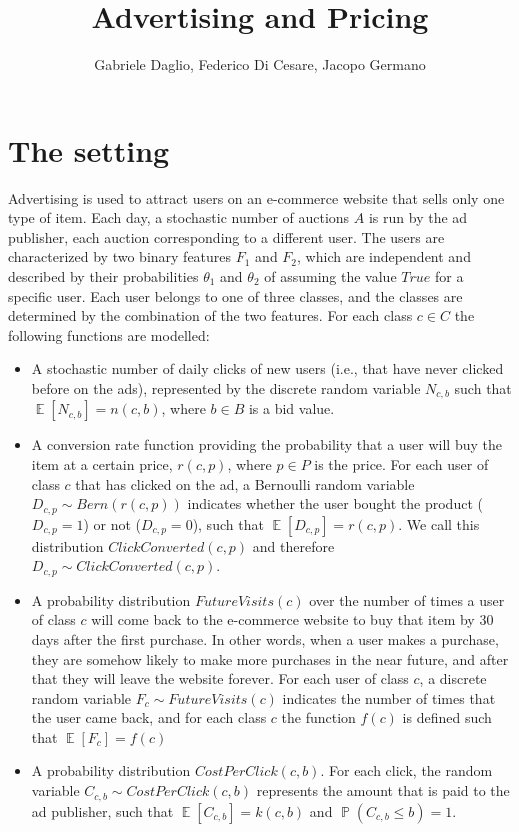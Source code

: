 \documentclass[11pt]{article} %
\title{Advertising and Pricing}
\author{Gabriele Daglio, Federico Di Cesare, Jacopo Germano}
\DeclareMathOperator{\EX}{\mathbb{E}}
\DeclareMathOperator{\Prob}{\mathbb{P}}
\begin{document}
\maketitle

\section{The setting}

Advertising is used to attract users on an e-commerce website that sells only one type of item. Each day, a stochastic number of auctions $A$ is run by the ad publisher, each auction corresponding to a different user. The users are characterized by two binary features $F_1$ and $F_2$, which are independent and described by their probabilities $\theta_1$ and $\theta_2$ of assuming the value $True$ for a specific user.
Each user belongs to one of three classes, and the classes are determined by the combination of the two features. 
For each class $c \in C$ the following functions are modelled:
\begin{itemize}
\item A stochastic number of daily clicks of new users (i.e., that have never clicked before on the ads), represented by the discrete random variable $N_{c,b}$ such that $\EX[N_{c,b}] = n(c,b)$, where $b \in B$ is a bid value.
\item A conversion rate function providing the probability that a user will buy the item at a certain price,  $r(c,p)$, where $p \in P$ is the price. For each user of class $c$ that has clicked on the ad, a Bernoulli random variable $D_{c,p} \sim Bern(r(c,p))$ indicates whether the user bought the product ($D_{c,p}=1$) or not ($D_{c,p}=0$), such that $\EX[D_{c,p}]=r(c,p)$. We call this distribution $ClickConverted(c,p)$ and therefore $D_{c,p} \sim ClickConverted(c,p)$.
\item A probability distribution $FutureVisits(c)$ over the number of times a user of class $c$ will come back to the e-commerce website to buy that item by 30 days after the first purchase. In other words, when a user makes a purchase, they are somehow likely to make more purchases in the near future, and after that they will leave the website forever. For each user of class $c$, a discrete random variable $F_c \sim FutureVisits(c)$ indicates the number of times that the user came back, and for each class $c$ the function $f(c)$ is defined such that $\EX[F_c] = f(c)$
\item A probability distribution $CostPerClick(c,b)$. For each click, the random variable $C_{c,b}\sim CostPerClick(c,b)$ represents the amount that is paid to the ad publisher, such that $\EX[C_{c,b}] = k(c,b)$ and $\Prob(C_{c,b} \leq b) = 1$.
\end{itemize}
\end{document}
